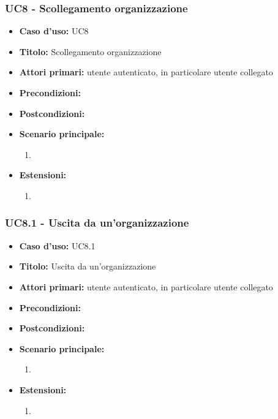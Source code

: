 \documentclass[casi-duso]{subfiles}
\begin{document}
\subsubsection{UC8 - Scollegamento organizzazione}
\label{subsub:uc8utente}
\begin{itemize}
  \item \textbf{Caso d’uso:} UC8
  \item \textbf{Titolo:} Scollegamento organizzazione
  \item \textbf{Attori primari:} utente autenticato, in particolare utente collegato
  \item \textbf{Precondizioni:} 
  \item \textbf{Postcondizioni:}
  \item \textbf{Scenario principale:} 
  \begin{enumerate}
    \item 
  \end{enumerate}  
  \item \textbf{Estensioni:} 
  \begin{enumerate}
    \item 
  \end{enumerate}  
\end{itemize}

\subsubsection{UC8.1 - Uscita da un'organizzazione}
\label{subsub:uc8.1utente}
\begin{itemize}
  \item \textbf{Caso d’uso:} UC8.1
  \item \textbf{Titolo:} Uscita da un'organizzazione
  \item \textbf{Attori primari:} utente autenticato, in particolare utente collegato
  \item \textbf{Precondizioni:} 
  \item \textbf{Postcondizioni:}
  \item \textbf{Scenario principale:} 
  \begin{enumerate}
    \item 
  \end{enumerate}  
  \item \textbf{Estensioni:} 
  \begin{enumerate}
    \item 
  \end{enumerate}  
\end{itemize}
\end{document}
